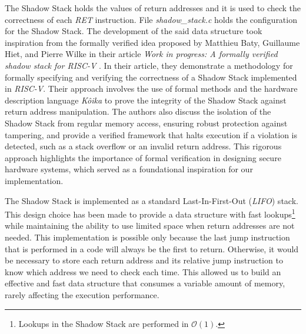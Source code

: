 The Shadow Stack holds the values of return addresses and it is used to check the
correctness of each \textit{RET} instruction. File \textit{shadow\_stack.c}
holds the configuration for the Shadow Stack. The development of the said data structure
took inspiration from the formally verified idea proposed by Matthieu Baty,
Guillaume Hiet, and Pierre Wilke in their article \textit{Work in progress: A formally
verified shadow stack for RISC-V} \cite{shadowstack}. In their article, they
demonstrate a methodology for formally specifying and verifying the correctness
of a Shadow Stack implemented in \textit{RISC-V}. Their approach involves the
use of formal methods and the hardware description language \textit{Kôika}\cite{koika}
to prove the integrity of the Shadow Stack against return address manipulation. The
authors also discuss the isolation of the Shadow Stack from regular memory access,
ensuring robust protection against tampering, and provide a verified framework that
halts execution if a violation is detected, such as a stack overflow or an
invalid return address. This rigorous approach highlights the importance of formal
verification in designing secure hardware systems, which served as a
foundational inspiration for our implementation.

The Shadow Stack is implemented as a standard Last-In-First-Out (\textit{LIFO}) stack.
This design choice has been made to provide a data structure with fast lookups\footnote{Lookups
in the Shadow Stack are performed in $\mathcal{O}(1)$.} while maintaining the ability
to use limited space when return addresses are not needed. This implementation
is possible only because the last jump instruction that is performed in a code
will always be the first to return. Otherwise, it would be necessary to store
each return address and its relative jump instruction to know which address we
need to check each time. This allowed us to build an effective and fast data structure
that consumes a variable amount of memory, rarely affecting the execution
performance.


